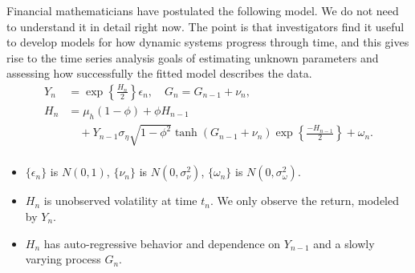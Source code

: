 \begin{frame}

Financial mathematicians have postulated the following model.
We do not need to understand it in detail right now. 
The point is that investigators find it useful to develop models for how dynamic systems progress through time, and this gives rise to the time series analysis goals of estimating unknown parameters and assessing how successfully the fitted model describes the data.
\begin{equation}
\begin{aligned} Y_n &= \exp\left\{\frac{H_n}{2}\right\} \epsilon_n,  \quad G_n = G_{n-1}+\nu_n,
\\
H_n &= \mu_h(1-\phi) + \phi H_{n-1} \\
&\quad +  Y_{n-1}\sigma_\eta\sqrt{1-\phi^2}\tanh(G_{n-1}+\nu_n)\exp\left\{\! \frac{-H_{n-1}}{2} \! \right\} + \omega_n.\\
\end{aligned}
\end{equation}
\begin{itemize}
\item $\{\epsilon_n\}$ is {\iid} $N(0,1)$, $\{\nu_n\}$ is {\iid} $N(0,\sigma_{\nu}^2)$, $\{\omega_n\}$ is {\iid} $N(0,\sigma_\omega^2)$.

\item $H_n$ is unobserved volatility at time $t_n$. We only observe the return, modeled by $Y_n$.

\item  $H_n$ has auto-regressive behavior and dependence on $Y_{n-1}$ and a slowly varying process $G_n$.

\end{itemize}

\end{frame}

